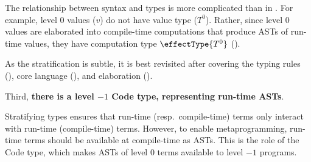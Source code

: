 The relationship between syntax and types is more complicated than in \efflang{}. For example, level $0$ values ($v$) do not have value type ($T^0$). Rather, since level $0$ values are elaborated into compile-time computations  that produce ASTs of run-time values, they have computation type $\effectType{T^{0}}$ (). 

As the stratification is subtle, it is best revisited after covering the typing rules (), core language (), and elaboration ().

Third, \textbf{there is a level $-1$ \textsf{Code} type, representing run-time ASTs}.

  Stratifying types ensures that run-time (resp.\ compile-time) terms only interact with run-time (compile-time) terms. However, to enable metaprogramming, run-time terms should be available at compile-time as ASTs. This is the role of the \textsf{Code} type, which makes ASTs of level $0$ terms available to level $-1$ programs.

